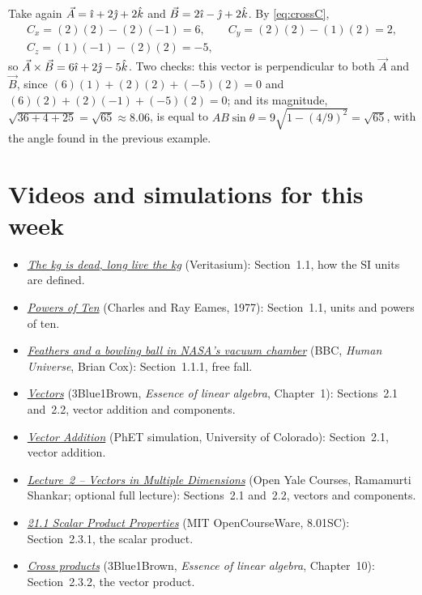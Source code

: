 \documentclass[11pt,a4paper]{article}
\begin{document}
\begin{example}
Take again $\vec{A} = \hat{\imath} + 2\hat{\jmath} + 2\hat{k}$ and $\vec{B} = 2\hat{\imath} - \hat{\jmath} + 2\hat{k}$. By
\eqref{eq:crossC},
\begin{gather*}
  C_x = (2)(2) - (2)(-1) = 6 , \qquad C_y = (2)(2) - (1)(2) = 2 , \\
  C_z = (1)(-1) - (2)(2) = -5 ,
\end{gather*}
so $\vec{A}\times\vec{B} = 6\hat{\imath} + 2\hat{\jmath} - 5\hat{k}$. Two checks: this vector is perpendicular
to both $\vec{A}$ and $\vec{B}$, since $(6)(1) + (2)(2) + (-5)(2) = 0$ and
$(6)(2) + (2)(-1) + (-5)(2) = 0$; and its magnitude, $\sqrt{36+4+25} = \sqrt{65} \approx 8.06$, is
equal to $AB\sin\theta = 9\sqrt{1 - (4/9)^2} = \sqrt{65}$, with the angle found in the previous
example.
\end{example}

\section*{Videos and simulations for this week}

\begin{itemize}[nosep]
  \item \href{https://www.youtube.com/watch?v=c_e1wITe_ig}{\emph{The kg is dead, long live the
    kg}} (Veritasium): Section~1.1, how the SI units are defined.
  \item \href{https://www.youtube.com/watch?v=0fKBhvDjuy0}{\emph{Powers of Ten}} (Charles and Ray
    Eames, 1977): Section~1.1, units and powers of ten.
  \item \href{https://www.youtube.com/watch?v=E43-CfukEgs}{\emph{Feathers and a bowling ball in
    NASA's vacuum chamber}} (BBC, \emph{Human Universe}, Brian Cox): Section~1.1.1, free fall.
  \item \href{https://www.youtube.com/watch?v=fNk_zzaMoSs}{\emph{Vectors}} (3Blue1Brown,
    \emph{Essence of linear algebra}, Chapter~1): Sections~2.1 and~2.2, vector addition and
    components.
  \item \href{https://phet.colorado.edu/en/simulations/vector-addition}{\emph{Vector Addition}}
    (PhET simulation, University of Colorado): Section~2.1, vector addition.
  \item \href{https://oyc.yale.edu/physics/phys-200/lecture-2}{\emph{Lecture~2 -- Vectors in
    Multiple Dimensions}} (Open Yale Courses, Ramamurti Shankar; optional full lecture):
    Sections~2.1 and~2.2, vectors and components.
  \item \href{https://www.ocw.mit.edu/courses/8-01sc-classical-mechanics-fall-2016/resources/21}{\emph{21.1
    Scalar Product Properties}} (MIT OpenCourseWare, 8.01SC): Section~2.3.1, the scalar product.
  \item \href{https://www.youtube.com/watch?v=eu6i7WJeinw}{\emph{Cross products}} (3Blue1Brown,
    \emph{Essence of linear algebra}, Chapter~10): Section~2.3.2, the vector product.
\end{itemize}
\end{document}

